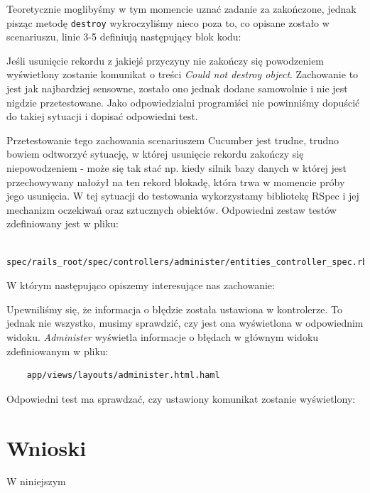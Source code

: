  	Teoretycznie moglibyśmy w tym momencie uznać zadanie za zakończone, jednak pisząc metodę \texttt{destroy} wykroczyliśmy nieco poza to, co opisane zostało w scenariuszu, linie 3-5 definiują następujący blok kodu:
 	
 	
 	
 	Jeśli usunięcie rekordu z jakiejś przyczyny nie zakończy się powodzeniem wyświetlony zostanie komunikat o treści \emph{Could not destroy object}.
 	Zachowanie to jest jak najbardziej sensowne, zostało ono jednak dodane samowolnie i nie jest nigdzie przetestowane. Jako odpowiedzialni programiści nie powinniśmy dopuścić do takiej sytuacji i dopisać odpowiedni test. 
 	
 	Przetestowanie tego zachowania scenariuszem Cucumber jest trudne, trudno bowiem odtworzyć sytuację, w której usunięcie rekordu zakończy się niepowodzeniem - może się tak stać np. kiedy silnik bazy danych w której jest przechowywany nałożył na ten rekord blokadę, która trwa w momencie próby jego usunięcia. W tej sytuacji do testowania wykorzystamy bibliotekę RSpec i jej mechanizm oczekiwań oraz sztucznych obiektów. Odpowiedni zestaw testów zdefiniowany jest w pliku:
 	
 	\begin{lstlisting}
 	spec/rails_root/spec/controllers/administer/entities_controller_spec.rb
 	\end{lstlisting}
 	
 	W którym następująco opiszemy interesujące nas zachowanie:
 	
 	
 	
 	Upewniliśmy się, że informacja o błędzie została ustawiona w kontrolerze. To jednak nie wszystko, musimy sprawdzić, czy jest ona wyświetlona w odpowiednim widoku. \emph{Administer} wyświetla informacje o błędach w głównym widoku zdefiniowanym w pliku:
 	
 	\begin{lstlisting}
 	app/views/layouts/administer.html.haml
 	\end{lstlisting}
 	
 	Odpowiedni test ma sprawdzać, czy ustawiony komunikat zostanie wyświetlony:
 	
 	
  
  \section{Wnioski}
  
  W niniejszym